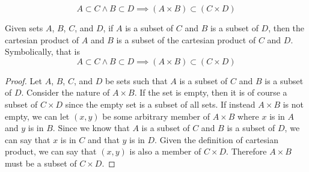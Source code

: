 \documentclass[main.tex]{subfiles}
\begin{document}
\subproblem{}\label{2j}
\[A \subset C \land B \subset D \implies (A \times B) \subset (C \times D)\]
\begin{thm}
	Given sets \(A\), \(B\), \(C\), and \(D\), if \(A\) is a subset of \(C\)
	and \(B\) is a subset of \(D\), then the cartesian product of \(A\) and
	\(B\) is a subset of the cartesian product of \(C\) and \(D\).
	Symbolically, that is
	\[A \subset C \land B \subset D \implies (A \times B) \subset (C \times D)\]
\end{thm}
\begin{proof}
	Let \(A\), \(B\), \(C\), and \(D\) be sets such that \(A\) is a subset
	of \(C\) and \(B\) is a subset of \(D\). Consider the nature of
	\(A \times B\). If the set is empty, then it is of course a subset of
	\(C \times D\) since the empty set is a subset of all sets. If instead
	\(A \times B\) is not empty, we can let \((x, y)\) be some arbitrary
	member of \(A \times B\) where \(x\) is in \(A\) and \(y\) is in \(B\).
	Since we know that \(A\) is a subset of \(C\) and \(B\) is a subset of
	\(D\), we can say that \(x\) is in \(C\) and that \(y\) is in \(D\).
	Given the definition of cartesian product, we can say that \((x, y)\) is
	also a member of \(C \times D\). Therefore \(A \times B\) must be a
	subset of \(C \times D\).
\end{proof}
\end{document}
